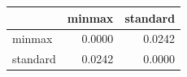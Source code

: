 \begin{tabular}{lrr}
\toprule
 & minmax & standard \\
\midrule
minmax & 0.0000 & 0.0242 \\
standard & 0.0242 & 0.0000 \\
\bottomrule
\end{tabular}

